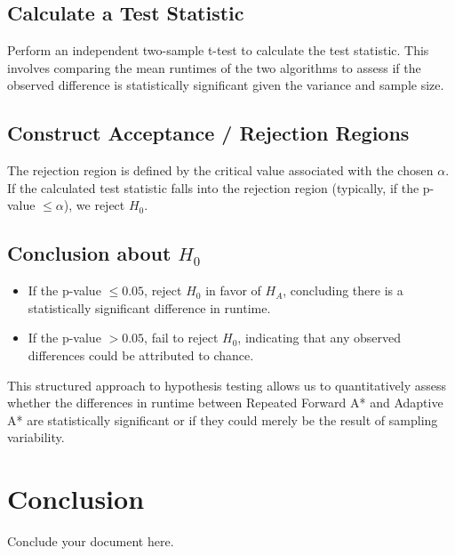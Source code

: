 \documentclass{article}
\begin{document}
\subsection{Calculate a Test Statistic}
Perform an independent two-sample t-test to calculate the test statistic. This involves comparing the mean runtimes of the two algorithms to assess if the observed difference is statistically significant given the variance and sample size.

\subsection{Construct Acceptance / Rejection Regions}
The rejection region is defined by the critical value associated with the chosen \(\alpha\). If the calculated test statistic falls into the rejection region (typically, if the p-value \(\leq \alpha\)), we reject \(H_0\).

\subsection{Conclusion about \(H_0\)}
\begin{itemize}
    \item If the p-value \(\leq 0.05\), reject \(H_0\) in favor of \(H_A\), concluding there is a statistically significant difference in runtime.
    \item If the p-value \(> 0.05\), fail to reject \(H_0\), indicating that any observed differences could be attributed to chance.
\end{itemize}

This structured approach to hypothesis testing allows us to quantitatively assess whether the differences in runtime between Repeated Forward A* and Adaptive A* are statistically significant or if they could merely be the result of sampling variability.


\section{Conclusion}
Conclude your document here.
\end{document}
